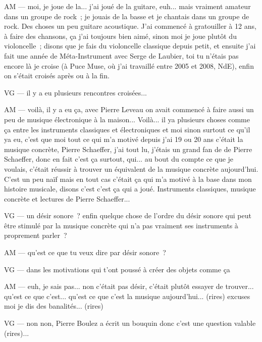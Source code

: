 AM — moi, je joue de la... j'ai joué de la guitare, euh... mais vraiment amateur dans un groupe de rock ; je jouais de la basse et je chantais dans un groupe de rock. Des choses un peu guitare acoustique. J'ai commencé à gratouiller à 12 ans, à faire des chansons, ça j'ai toujours bien aimé, sinon moi je joue plutôt du violoncelle ; disons que je fais du violoncelle classique depuis petit, et ensuite j'ai fait une année de Méta-Instrument avec Serge de Laubier, toi tu n'étais pas encore là je croise (à Puce Muse, où j'ai travaillé entre 2005 et 2008, NdE), enfin on s'était croisés après ou à la fin.

VG — il y a eu plusieurs rencontres croisées... 

AM — voilà, il y a eu ça, avec Pierre Leveau on avait commencé à faire aussi un peu de musique électronique à la maison... Voilà... il ya plusieurs choses comme ça entre les instruments classiques et électroniques et moi sinon surtout ce qu'il ya eu, c'est que moi tout ce qui m'a motivé depuis j'ai 19 ou 20 ans c'était la musique concrète, Pierre Schaeffer, j'ai tout lu, j'étais un grand fan de de Pierre Schaeffer, donc en fait c'est ça surtout, qui... au bout du compte ce que je voulais, c'était réussir à trouver un équivalent de la musique concrète aujourd'hui. C'est un peu naïf mais en tout cas c'était ça qui m'a motivé à la base dans mon histoire musicale, disons c'est c'est ça qui a joué. Instruments classiques, musique concrète et lectures de Pierre Schaeffer... 

VG — un désir sonore ? enfin quelque chose de l'ordre du désir sonore qui peut être stimulé par la musique concrète qui n'a pas vraiment ses instruments à proprement parler ?

AM — qu'est ce que tu veux dire par désir sonore ?

VG — dans les motivations qui t'ont poussé à créer des objets comme ça 

AM — euh, je sais pas... non c'était pas désir, c'était plutôt essayer de trouver... qu'est ce que c'est... qu'est ce que c'est la musique aujourd'hui... (rires) excuses moi je dis des banalités... (rires)

VG — non non, Pierre Boulez a écrit un bouquin donc c'est une question valable (rires)... 

